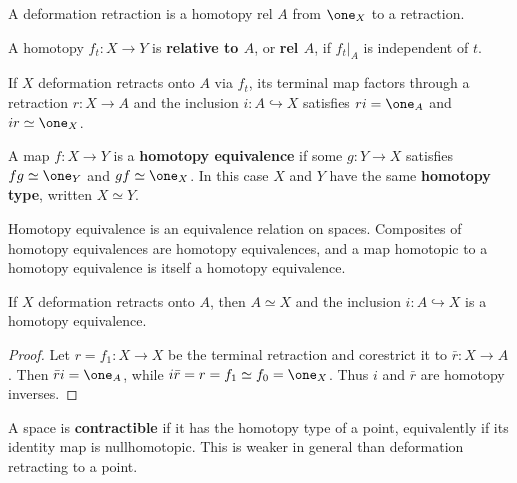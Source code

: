 A deformation retraction is a homotopy rel $A$ from $\one_X$ to a retraction.

\begin{definition}
\label{def:homotopy-rel-a}
\leanok
{}
A homotopy $f_t:X\to Y$ is \textbf{relative to $A$}, or \textbf{rel $A$}, if
$f_t|_A$ is independent of $t$.
\end{definition}

If $X$ deformation retracts onto $A$ via $f_t$, its terminal map factors through a
retraction $r:X\to A$ and the inclusion $i:A\hookrightarrow X$ satisfies
$ri=\one_A$ and $ir\simeq\one_X$.

\begin{definition}
\label{def:homotopy-equivalence}
\leanok
{}
A map $f:X\to Y$ is a \textbf{homotopy equivalence} if some $g:Y\to X$ satisfies
$fg\simeq\one_Y$ and $gf\simeq\one_X$. In this case $X$ and $Y$ have the same
\textbf{homotopy type}, written $X\simeq Y$.
\end{definition}

Homotopy equivalence is an equivalence relation on spaces. Composites of homotopy
equivalences are homotopy equivalences, and a map homotopic to a homotopy
equivalence is itself a homotopy equivalence.

\begin{proposition}
\label{prop:deformation-retract-homotopy-equivalence}
\leanok
{}
If $X$ deformation retracts onto $A$, then $A\simeq X$ and the inclusion
$i:A\hookrightarrow X$ is a homotopy equivalence.
\end{proposition}

\begin{proof}
\leanok
{}
\sketch Let $r=f_1:X\to X$ be the terminal retraction and corestrict it to
$\bar r:X\to A$. Then $\bar r i=\one_A$, while $i\bar r=r=f_1\simeq f_0=\one_X$.
Thus $i$ and $\bar r$ are homotopy inverses.
\end{proof}

\begin{definition}
\label{def:contractible}
\leanok
{}
A space is \textbf{contractible} if it has the homotopy type of a point, equivalently
if its identity map is nullhomotopic. This is weaker in general than deformation
retracting to a point.
\end{definition}

